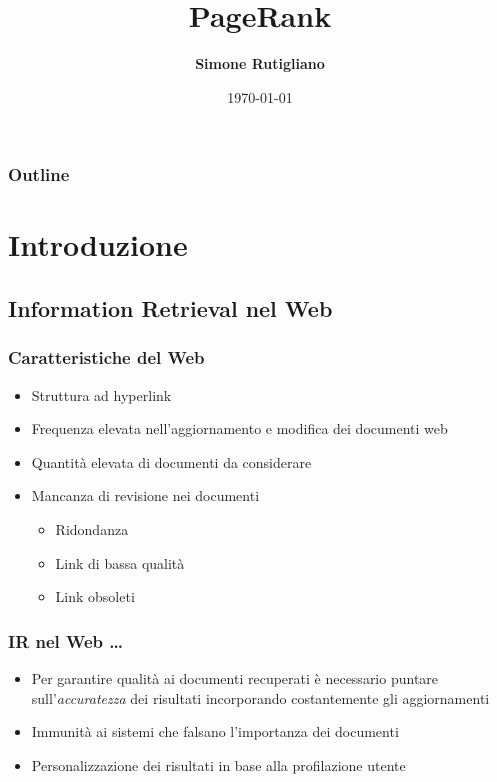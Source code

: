 \documentclass{beamer}
\title[PAGERANK]{PageRank}
\institute{
\begin{small}
Corso di Laurea in Informatica Magistrale
\end{small}}
\author{\textbf{Simone Rutigliano}}
\date{\tiny{\today}}
\begin{document}

\begin{frame}
\maketitle
\end{frame}


\begin{frame}
\frametitle{Outline}
	\tableofcontents
\end{frame}


\section{Introduzione}
\subsection{Information Retrieval nel Web}
\begin{frame}
	\frametitle{Caratteristiche del Web}
	\begin{itemize}
		\item Struttura ad hyperlink
		\item Frequenza elevata nell'aggiornamento e modifica dei documenti web
		\item Quantità elevata di documenti da considerare
		\item Mancanza di revisione nei documenti
		\begin{itemize}
			\item Ridondanza
			\item Link di bassa qualità
			\item Link obsoleti
		\end{itemize}
	\end{itemize}
\end{frame}

\begin{frame}
	\frametitle{IR nel Web \dots}
	\begin{itemize}
	\item Per garantire qualità ai documenti recuperati è necessario puntare sull'\emph{accuratezza} dei risultati incorporando costantemente gli aggiornamenti
	\item Immunità ai sistemi che falsano l'importanza dei documenti
	\item Personalizzazione dei risultati in base alla profilazione utente
\end{itemize}
\end{frame}
\end{document}

